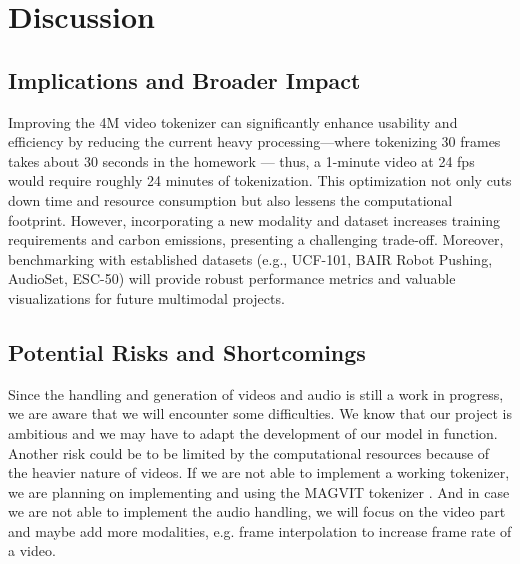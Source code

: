 \documentclass[10pt,conference,compsocconf]{IEEEtran}
\begin{document}
\section{Discussion}

\subsection{Implications and Broader Impact}
Improving the 4M video tokenizer can significantly enhance usability and efficiency by reducing the current heavy processing—where tokenizing 30 frames takes about 30 seconds in the homework — thus, a 1-minute video at 24 fps would require roughly 24 minutes of tokenization. This optimization not only cuts down time and resource consumption but also lessens the computational footprint. However, incorporating a new modality and dataset increases training requirements and carbon emissions, presenting a challenging trade-off. Moreover, benchmarking with established datasets (e.g., UCF-101, BAIR Robot Pushing, AudioSet, ESC-50) will provide robust performance metrics and valuable visualizations for future multimodal projects.

\subsection{Potential Risks and Shortcomings}
Since the handling and generation of videos and audio is still a work in progress, we are aware that we will encounter some difficulties. We know that our project is ambitious and we may have to adapt the development of our model in function. Another risk could be to be limited by the computational resources because of the heavier nature of videos.
If we are not able to implement a working tokenizer, we are planning on implementing and using the MAGVIT tokenizer \cite{yu_magvit_2023}. And in case we are not able to implement the audio handling, we will focus on the video part and maybe add more modalities, e.g. frame interpolation to increase frame rate of a video.




\end{document}
